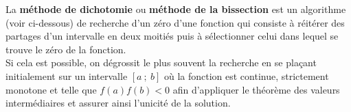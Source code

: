 
\begin{TP}


La \textbf{méthode de dichotomie} ou \textbf{méthode de la bissection} est un algorithme (voir ci-dessous) de recherche d'un zéro d'une fonction qui consiste à réitérer des partages d’un intervalle en deux  moitiés puis à sélectionner celui dans lequel se trouve le zéro de la fonction.\\
Si cela est possible, on dégrossit le plus souvent la recherche en se plaçant initialement sur un intervalle $[a~;~b]$ où la fonction est continue, strictement monotone
et telle que $f(a)f(b)<0$ afin d'appliquer le théorème des valeurs intermédiaires et assurer ainsi l'unicité de la solution.\\


\end{TP}
